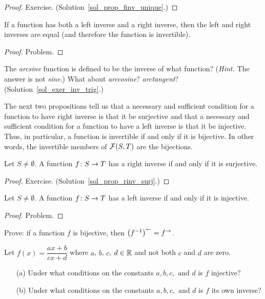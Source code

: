 \begin{proof} Exercise. (Solution~\ref{sol_prop_finv_unique}.)  \ns  \end{proof}

\begin{prop}  If a function has both a left inverse and a right inverse, then the left and right
inverses are equal (and therefore the function is invertible).
\end{prop}

\begin{proof} Problem.  \ns  \end{proof}

\begin{exer}\label{exer_inv_trig}  The \emph{arcsine} function is defined to be the inverse
of what function? (\emph{Hint.}  The answer is not \emph{sine}.) What about \emph{arccosine}?
\emph{arctangent}? (Solution~\ref{sol_exer_inv_trig}.)
\end{exer}

The next two propositions tell us that a necessary and sufficient condition for a function to
have right inverse is that it be surjective and that a necessary and sufficient condition for
a function to have a left inverse is that it be injective. Thus, in particular, a function is
invertible if and only if it is bijective. In other words, the invertible members of $\mathcal{F}(S,T)$ are the bijections.

\begin{prop}\label{prop_rinv_surj}  Let $S \ne \emptyset$. A function $f\colon S \rightarrow T$ has a
right inverse if and only if it is surjective.
\end{prop}

\begin{proof} Exercise. (Solution~\ref{sol_prop_rinv_surj}.)  \ns  \end{proof}

\begin{prop}\label{prop_linv_inj}  Let $S \ne \emptyset$. A function $f\colon S \rightarrow T$ has a left
inverse if and only if it is injective.
\end{prop}

\begin{proof}  Problem.  \ns   \end{proof}

\begin{prob} Prove: if a function $f$ is bijective, then $\bigl(f^{-1}\bigr)^\gets = f^{\rightarrow}$.
\end{prob}

\begin{prob}  Let $ f(x) = \dfrac{ax + b}{cx + d}$ where $a$, $b$, $c$, $d \in \mathbb{R}$ and not both
$c$ and $d$ are zero.
 \begin{enumerate}
   \item[(a)] Under what conditions on the constants $a, b, c, \text{ and } d$ is $f$ injective?
   \item[(b)] Under what conditions on the constants $a, b, c, \text{ and } d$ is $f$ its own inverse?
 \end{enumerate}
\end{prob}


\endinput
